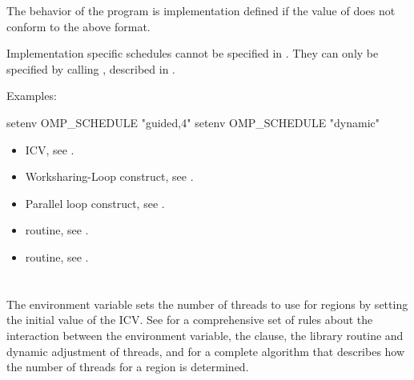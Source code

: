 The behavior of the program is implementation defined if the value of 
does not conform to the above format.

Implementation specific schedules cannot be specified in . They can
only be specified by calling , described in .

Examples:

\begin{ompEnv}
setenv OMP_SCHEDULE "guided,4"
setenv OMP_SCHEDULE "dynamic"
\end{ompEnv}

\crossreferences
\begin{itemize}
\item {} ICV, see .

\item Worksharing-Loop construct, see .

\item Parallel loop construct, see .

\item {} routine, see .

\item {} routine, see .
\end{itemize}









\section{}
\label{sec:OMP_NUM_THREADS}
The  environment variable sets the number of threads to use for
 regions by setting the initial value of the  ICV. See
 for a comprehensive set of rules about the interaction between the
 environment variable, the  clause, the
 library routine and dynamic adjustment of threads, and
for a complete algorithm that describes how the number of
threads for a  region is determined.

